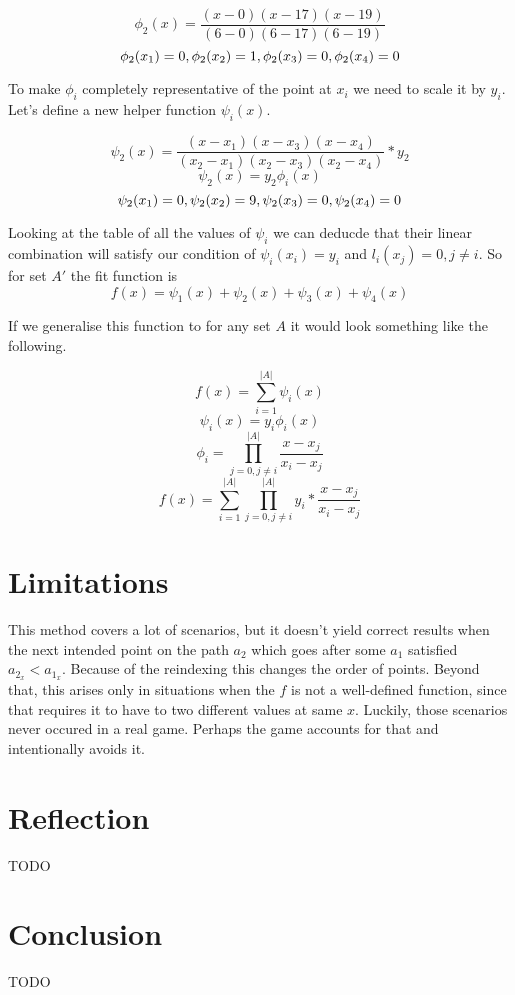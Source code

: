 \documentclass[12pt, titlepage]{article}
\newcommand{\TODO}{\begin{center}\color{red}TODO\end{center}}
\begin{document}
\begin{equation}
    \phi_2(x) = \frac{(x - 0)(x - 17)(x - 19)}{(6 - 0)(6 - 17)(6 - 19)}
\end{equation}
$$\phi_2(x_1) = 0, \phi_2(x_2) = 1\\,\phi_2(x_3) = 0\\, \phi_2(x_4) = 0\\$$

To make $\phi_i$ completely representative of the point at $x_i$ we need to 
scale it by $y_i$. Let's define a new helper function $\psi_i(x)$.

\begin{equation}
    \psi_2(x) = \frac{(x - x_1)(x - x_3)(x - x_4)}{(x_2 - x_1)(x_2 - x_3)(x_2 - x_4)} * y_2
\end{equation}
\begin{equation}
    \psi_2(x) = y_2 \phi_i(x)
\end{equation}
$$\psi_2(x_1) = 0, \psi_2(x_2) = 9\\,\psi_2(x_3) = 0\\, \psi_2(x_4) = 0\\$$

Looking at the table of all the values of $\psi_i$ we can deducde that their linear
combination will satisfy our condition of $\psi_i(x_i) = y_i$ and 
$l_i(x_j) = 0, j \neq i$. So for set $A'$ the fit function is 
$$f(x) = \psi_1(x) + \psi_2(x) + \psi_3(x) + \psi_4(x)$$

If we generalise this function to for any set $A$ it would look something 
like the following.

$$f(x) = \sum_{i=1}^{|A|}\psi_i(x)$$
$$\psi_i(x) = y_i \phi_i(x)$$
\begin{equation}
    \phi_i = \prod_{j=0, j \neq i}^{|A|}\frac{x - x_j}{x_i - x_j}
\end{equation}
\begin{equation}
f(x) = \sum_{i=1}^{|A|} \prod_{j=0, j \neq i}^{|A|}y_i * \frac{x - x_j}{x_i - x_j}
\end{equation}

\section{Limitations}
This method covers a lot of scenarios, but it doesn't yield correct results
when the next intended point on the path $a_2$ which goes after some $a_1$
satisfied $a_{2_x} < a_{1_x}$. Because of the reindexing this changes the order
of points. Beyond that, this arises only in situations when the $f$ is not
a well-defined function, since that requires it to have to two different values
at same $x$. Luckily, those scenarios never occured in a real game. Perhaps 
the game accounts for that and intentionally avoids it.

\section{Reflection}
\TODO

\section{Conclusion}
\TODO
\end{document}
